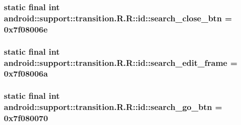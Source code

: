 \hypertarget{classandroid_1_1support_1_1transition_1_1_r_1_1id_0da12c6e81f31674b3d687ffa28557ef}{
\subsubsection[{search\_\-close\_\-btn}]{\setlength{\rightskip}{0pt plus 5cm}static final int android::support::transition.R.R::id::search\_\-close\_\-btn = 0x7f08006e}}
\label{classandroid_1_1support_1_1transition_1_1_r_1_1id_0da12c6e81f31674b3d687ffa28557ef}


\hypertarget{classandroid_1_1support_1_1transition_1_1_r_1_1id_91431eca672f1af17ed31f10caf5bd2b}{
\subsubsection[{search\_\-edit\_\-frame}]{\setlength{\rightskip}{0pt plus 5cm}static final int android::support::transition.R.R::id::search\_\-edit\_\-frame = 0x7f08006a}}
\label{classandroid_1_1support_1_1transition_1_1_r_1_1id_91431eca672f1af17ed31f10caf5bd2b}


\hypertarget{classandroid_1_1support_1_1transition_1_1_r_1_1id_145b2a5e93731d2ddfe9a4d90210d27e}{
\subsubsection[{search\_\-go\_\-btn}]{\setlength{\rightskip}{0pt plus 5cm}static final int android::support::transition.R.R::id::search\_\-go\_\-btn = 0x7f080070}}
\label{classandroid_1_1support_1_1transition_1_1_r_1_1id_145b2a5e93731d2ddfe9a4d90210d27e}


